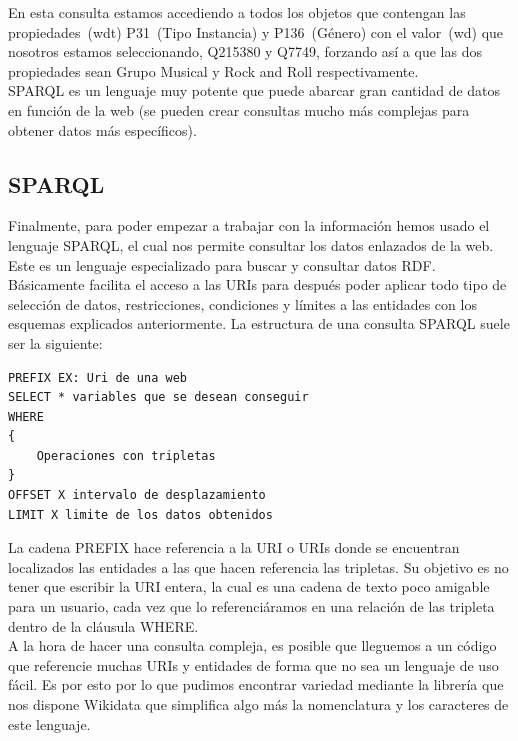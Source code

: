 En esta consulta estamos accediendo a todos los objetos que contengan las propiedades~(wdt) P31~(Tipo Instancia) y P136~(Género) con el valor~(wd) que nosotros estamos seleccionando, Q215380 y Q7749, forzando así a que las dos propiedades sean Grupo Musical y Rock and Roll respectivamente.\\

SPARQL es un lenguaje muy potente que puede abarcar gran cantidad de datos en función de la web (se pueden crear consultas mucho más complejas para obtener datos más específicos).


\subsection{SPARQL}

Finalmente, para poder empezar a trabajar con la información hemos usado el lenguaje SPARQL, el cual nos permite consultar los datos enlazados de la web. Este es un lenguaje especializado para buscar y consultar datos RDF. Básicamente facilita el acceso a las URIs para después poder aplicar todo tipo de selección de datos, restricciones, condiciones y límites a las entidades con los esquemas explicados anteriormente. La estructura de una consulta SPARQL suele ser la siguiente:\\

\begin{lstlisting}[language=SPARQL]
PREFIX EX: Uri de una web
SELECT * variables que se desean conseguir
WHERE
{
	Operaciones con tripletas
}
OFFSET X intervalo de desplazamiento
LIMIT X limite de los datos obtenidos
\end{lstlisting}
\bigskip

La cadena PREFIX hace referencia a la URI o URIs donde se encuentran localizados las entidades a las que hacen referencia las tripletas. Su objetivo es no tener que escribir la URI entera, la cual es una cadena de texto poco amigable para un usuario, cada vez que lo referenciáramos en una relación de las tripleta dentro de la cláusula WHERE.\\

A la hora de hacer una consulta compleja, es posible que lleguemos a un código que referencie muchas URIs y entidades de forma que no sea un lenguaje de uso fácil. Es por esto por lo que pudimos encontrar variedad mediante la librería que nos dispone Wikidata que simplifica algo más la nomenclatura y los caracteres de este lenguaje.\\

